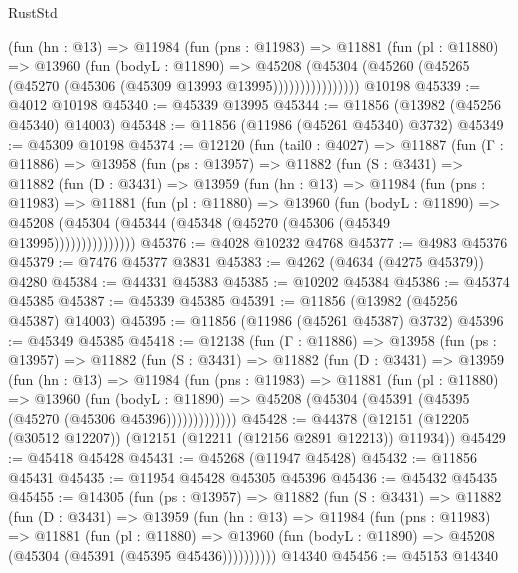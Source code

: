 \begin{lexlean}{RustStd}
\begin{coremodule}
                (fun (hn : @13) =>
                @11984
                  (fun (pns : @11983) =>
                  @11881
                    (fun (pl : @11880) =>
                    @13960
                      (fun (bodyL : @11890) =>
                      @45208
                        (@45304
                          (@45260 (@45265 (@45270 (@45306 (@45309 @13993 @13995))))))))))))))))
    @10198
@45339 := @4012 @10198
@45340 := @45339 @13995
@45344 := @11856 (@13982 (@45256 @45340) @14003)
@45348 := @11856 (@11986 (@45261 @45340) @3732)
@45349 := @45309 @10198
@45374 := @12120
    (fun (tail0 : @4027) =>
    @11887
      (fun (Γ : @11886) =>
      @13958
        (fun (ps : @13957) =>
        @11882
          (fun (S : @3431) =>
          @11882
            (fun (D : @3431) =>
            @13959
              (fun (hn : @13) =>
              @11984
                (fun (pns : @11983) =>
                @11881
                  (fun (pl : @11880) =>
                  @13960
                    (fun (bodyL : @11890) =>
                    @45208 (@45304 (@45344 (@45348 (@45270 (@45306 (@45349 @13995)))))))))))))))
@45376 := @4028 @10232 @4768
@45377 := @4983 @45376
@45379 := @7476 @45377 @3831
@45383 := @4262 (@4634 (@4275 @45379)) @4280
@45384 := @44331 @45383
@45385 := @10202 @45384
@45386 := @45374 @45385
@45387 := @45339 @45385
@45391 := @11856 (@13982 (@45256 @45387) @14003)
@45395 := @11856 (@11986 (@45261 @45387) @3732)
@45396 := @45349 @45385
@45418 := @12138
    (fun (Γ : @11886) =>
    @13958
      (fun (ps : @13957) =>
      @11882
        (fun (S : @3431) =>
        @11882
          (fun (D : @3431) =>
          @13959
            (fun (hn : @13) =>
            @11984
              (fun (pns : @11983) =>
              @11881
                (fun (pl : @11880) =>
                @13960
                  (fun (bodyL : @11890) =>
                  @45208 (@45304 (@45391 (@45395 (@45270 (@45306 @45396)))))))))))))
@45428 := @44378 (@12151 (@12205 (@30512 @12207)) (@12151 (@12211 (@12156 @2891 @12213)) @11934))
@45429 := @45418 @45428
@45431 := @45268 (@11947 @45428)
@45432 := @11856 @45431
@45435 := @11954 @45428 @45305 @45396
@45436 := @45432 @45435
@45455 := @14305
    (fun (ps : @13957) =>
    @11882
      (fun (S : @3431) =>
      @11882
        (fun (D : @3431) =>
        @13959
          (fun (hn : @13) =>
          @11984
            (fun (pns : @11983) =>
            @11881
              (fun (pl : @11880) =>
              @13960 (fun (bodyL : @11890) => @45208 (@45304 (@45391 (@45395 @45436))))))))))
    @14340
@45456 := @45153 @14340

\end{coremodule}
\end{lexlean}
